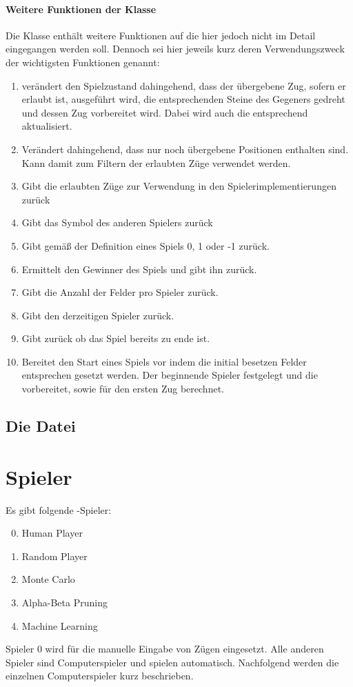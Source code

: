 \paragraph{Weitere Funktionen der Klasse }
Die Klasse  enthält weitere Funktionen auf die hier jedoch nicht im Detail eingegangen werden soll. Dennoch sei hier jeweils kurz deren Verwendungszweck der wichtigsten Funktionen genannt:
\begin{enumerate}
\item[\code{play\_position}] verändert den Spielzustand dahingehend, dass der übergebene Zug, sofern er erlaubt ist, ausgeführt wird, die entsprechenden Steine des Gegeners gedreht und dessen Zug vorbereitet wird. Dabei wird auch die  entsprechend aktualisiert.
\item[\code{set\_available\_moves}] Verändert  dahingehend, dass nur noch übergebene Positionen enthalten sind. Kann damit zum Filtern der erlaubten Züge verwendet werden.
\item[\code{get\_available\_moves}] Gibt die erlaubten Züge zur Verwendung in den Spielerimplementierungen zurück
\item[\code{other\_player}] Gibt das Symbol des anderen Spielers zurück
\item[\code{utility}] Gibt gemäß der Definition eines Spiels 0, 1 oder -1 zurück.
\item[\code{get\_winner}] Ermittelt den Gewinner des Spiels und gibt ihn zurück.
\item[\code{get\_statistics}] Gibt die Anzahl der Felder pro Spieler zurück.
\item[\code{get\_current\_player}] Gibt den derzeitigen Spieler zurück.
\item[\code{game\_is\_over}] Gibt zurück ob das Spiel bereits zu ende ist.
\item[\code{init\_game}] Bereitet den Start eines Spiels vor indem die initial besetzen Felder entsprechen gesetzt werden. Der beginnende Spieler festgelegt und die   vorbereitet, sowie  für den ersten Zug berechnet.
\end{enumerate}
\subsection{Die Datei }
\section{Spieler}
Es gibt folgende -Spieler:
\begin{enumerate}
\setcounter{enumi}{-1}
\item Human Player
\item Random Player
\item Monte Carlo
\item Alpha-Beta Pruning
\item Machine Learning
\end{enumerate}
Spieler 0 wird für die manuelle Eingabe von Zügen eingesetzt. Alle anderen Spieler sind Computerspieler und spielen automatisch.
Nachfolgend werden die einzelnen Computerspieler kurz beschrieben.

